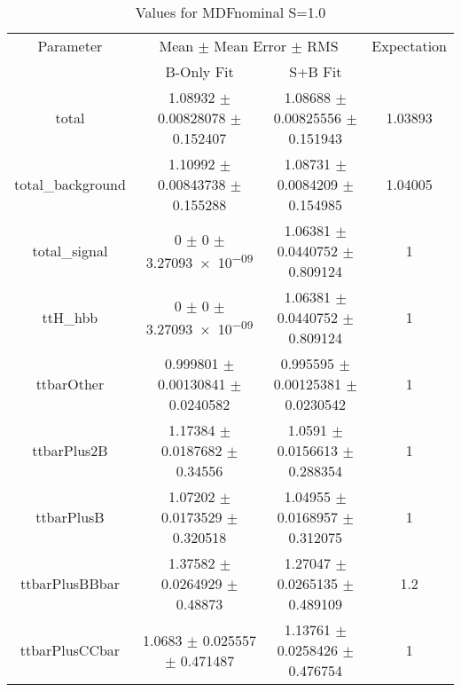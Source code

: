 \begin{table}
\centering
\caption{Values for MDFnominal S=1.0}
\begin{tabular}{cccc}
\toprule
Parameter & \multicolumn{2}{c}{Mean $\pm$ Mean Error $\pm$ RMS} & Expectation\\
 & B-Only Fit & S+B Fit & \\
\midrule
total & \num{1.08932} $\pm$ \num{0.00828078} $\pm$ \num{0.152407} & \num{1.08688} $\pm$ \num{0.00825556} $\pm$ \num{0.151943} & \num{1.03893}\\
total\_background & \num{1.10992} $\pm$ \num{0.00843738} $\pm$ \num{0.155288} & \num{1.08731} $\pm$ \num{0.0084209} $\pm$ \num{0.154985} & \num{1.04005}\\
total\_signal & \num{0} $\pm$ \num{0} $\pm$ \num{3.27093e-09} & \num{1.06381} $\pm$ \num{0.0440752} $\pm$ \num{0.809124} & \num{1}\\
ttH\_hbb & \num{0} $\pm$ \num{0} $\pm$ \num{3.27093e-09} & \num{1.06381} $\pm$ \num{0.0440752} $\pm$ \num{0.809124} & \num{1}\\
ttbarOther & \num{0.999801} $\pm$ \num{0.00130841} $\pm$ \num{0.0240582} & \num{0.995595} $\pm$ \num{0.00125381} $\pm$ \num{0.0230542} & \num{1}\\
ttbarPlus2B & \num{1.17384} $\pm$ \num{0.0187682} $\pm$ \num{0.34556} & \num{1.0591} $\pm$ \num{0.0156613} $\pm$ \num{0.288354} & \num{1}\\
ttbarPlusB & \num{1.07202} $\pm$ \num{0.0173529} $\pm$ \num{0.320518} & \num{1.04955} $\pm$ \num{0.0168957} $\pm$ \num{0.312075} & \num{1}\\
ttbarPlusBBbar & \num{1.37582} $\pm$ \num{0.0264929} $\pm$ \num{0.48873} & \num{1.27047} $\pm$ \num{0.0265135} $\pm$ \num{0.489109} & \num{1.2}\\
ttbarPlusCCbar & \num{1.0683} $\pm$ \num{0.025557} $\pm$ \num{0.471487} & \num{1.13761} $\pm$ \num{0.0258426} $\pm$ \num{0.476754} & \num{1}\\
\bottomrule
\end{tabular}
\end{table}